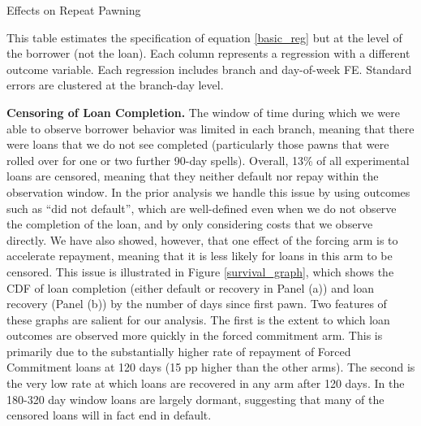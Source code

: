 \documentclass[11pt, a4paper]{article}
\begin{document}
\begin{table}
\caption{Effects on Repeat Pawning}
\label{repeat_loans}
\begin{center}
\scriptsize{}
\end{center}
 \scriptsize{This table estimates the specification of equation \ref{basic_reg} but at the level of the borrower (not the loan). Each column represents a regression with a different outcome variable.
 Each regression includes branch and day-of-week FE. Standard errors are clustered at the branch-day level.}
\end{table}

\vspace{.2in}
\noindent \textbf{Censoring of Loan Completion.}
The window of time during which we were able to observe borrower behavior was limited in each branch, meaning that there were loans that we do not see completed (particularly those pawns that were rolled over for one or two further 90-day spells).  Overall, 13\% of all experimental loans are censored, meaning that they neither default nor repay within the observation window.  In the prior analysis we handle this issue by using outcomes such as ``did not default'', which are well-defined even when we do not observe the completion of the loan, and by only considering costs that we observe directly.  We have also showed, however, that one effect of the forcing arm is to accelerate repayment, meaning that it is less likely for loans in this arm to be censored.  This issue is illustrated in Figure \ref{survival_graph}, which shows the CDF of loan completion (either default or recovery in Panel (a)) and loan recovery (Panel (b)) by the number of days since first pawn.  Two features of these graphs are salient for our analysis.  The first is the extent to which loan outcomes are observed more quickly in the forced commitment arm.  This is primarily due to the substantially higher rate of repayment of Forced Commitment loans at 120 days (15 pp higher than the other arms).  The second is the very low rate at which loans are recovered in any arm after 120 days.  In the 180-320 day window loans are largely dormant, suggesting that many of the censored loans will in fact end in default.
\end{document}
